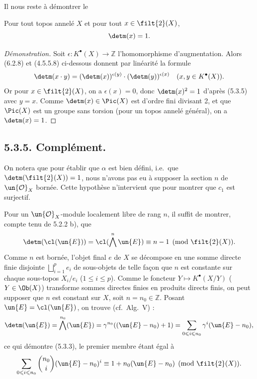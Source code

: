 Il nous reste \`a d\'emontrer le

\begin{lemme}[5.3.4]
Pour tout topos annel\'e $X$ et pour tout $x \in \filt{2}(X)$,
\[
\detm(x) = 1.
\]
\end{lemme}

\begin{proof}[D\'emonstration]
Soit $\epsilon : K^{\bullet}(X) \to \mathbb{Z}$ l'homomorphisme d'augmentation. Alors (6.2.8) et (4.5.5.8) ci-dessous donnent par lin\'earit\'e la formule
\begin{equation}\label{eq:5.3.5}
\detm(x \cdot y) = (\detm(x))^{\epsilon(y)} \cdot (\detm(y))^{\epsilon(x)} \quad (x, y \in K^{\bullet}(X)).
\end{equation}
Or pour $x \in \filt{2}(X)$, on a $\epsilon(x) = 0$, donc $\detm(x)^{2} = 1$ d'apr\`es (5.3.5) avec $y = x$. Comme $\detm(x) \in \Pic(X)$ est d'ordre fini divisant 2, et que $\Pic(X)$ est un groupe sans torsion (pour un topos annel\'e g\'en\'eral), on a $\detm(x) = 1$.
\end{proof}

\subsection*{5.3.5. Compl\'ement.}

On notera que pour \'etablir que $\alpha$ est bien d\'efini, i.e.\ que $\detm(\filt{2}(X)) = 1$, nous n'avons pas eu \`a supposer la section $n$ de $\un{\mathcal{O}}_{X}$ born\'ee. Cette hypoth\`ese n'intervient que pour montrer que $c_{1}$ est surjectif.

Pour un $\un{\mathcal{O}}_{X}$-module localement libre de rang $n$, il suffit de montrer, compte tenu de 5.2.2 b), que
\begin{equation}\label{eq:5.3.3}
\detm(\cl(\un{E})) = \cl(\bigwedge^{n} \un{E}) \equiv n - 1 \pmod{\filt{2}(X)}.
\end{equation}
Comme $n$ est born\'ee, l'objet final $e$ de $X$ se d\'ecompose en une somme directe finie disjointe $\bigsqcup_{i=1}^{p} e_{i}$ de sous-objets de telle fa\c con que $n$ est constante sur chaque sous-topos $X_{i}/e_{i}$ ($1 \leqslant i \leqslant p$). Comme le foncteur $Y \mapsto K^{\bullet}(X/Y)$ ($Y \in \Ob(X)$) transforme sommes directes finies en produits directs finis, on peut supposer que $n$ est constant sur $X$, soit $n = n_{0} \in \mathbb{Z}$. Posant $\un{E} = \cl(\un{E})$, on trouve (cf.\ Alg.\ V) :
\[
\detm(\un{E}) = \bigwedge^{n_{0}}(\un{E}) = \gamma^{n_{0}}((\un{E} - n_{0}) + 1) = \sum_{0 \leqslant i \leqslant n_{0}} \gamma^{i}(\un{E} - n_{0}),
\]
ce qui d\'emontre (5.3.3), le premier membre \'etant \'egal \`a
\[
\sum_{0 \leqslant i \leqslant n_{0}} \binom{n_{0}}{i} (\un{E} - n_{0})^{i} \equiv 1 + n_{0}(\un{E} - n_{0}) \pmod{\filt{2}(X)}.
\]

